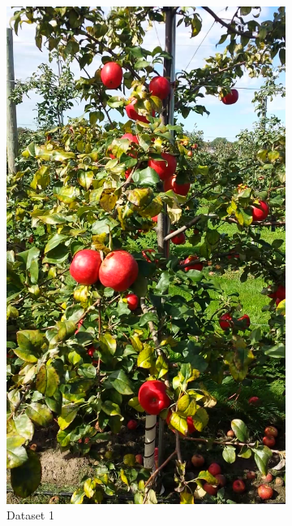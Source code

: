 \begin{figure}[ht]
    \centering
    \begin{subfigure}[b]{0.22\textwidth}
        \includegraphics[width=\textwidth]{figures/detection/dataset1.png}
        \caption{Dataset 1}
        \label{fig:valida}
    \end{subfigure}\hspace{.2cm}\begin{subfigure}[b]{0.22\textwidth}

\end{subfigure}
\end{figure}

